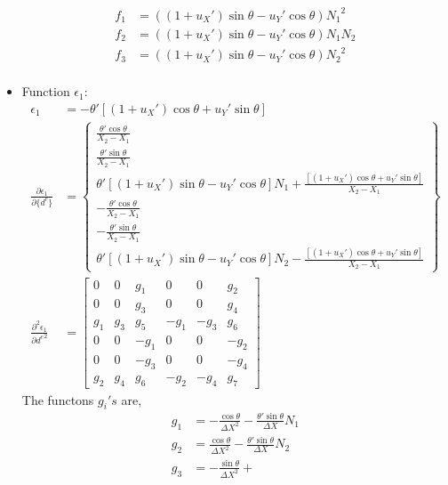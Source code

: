 \documentclass[10pt]{article}
\begin{document}
\begin{itemize}
\begin{align}
    f_1 &= ((1+u_X')\sin\theta - u_Y'\cos\theta){N_1}^2\nonumber\\
    f_2 &= ((1+u_X')\sin\theta - u_Y'\cos\theta)N_1N_2\nonumber\\
    f_3 &= ((1+u_X')\sin\theta - u_Y'\cos\theta){N_2}^2\nonumber\\
    \label{eq:g0e}    
  \end{align}
\item Function $\epsilon_1$:
  \begin{align}
    \epsilon_1 &= -\theta'\left[(1+u_X')\cos\theta +
                 u_Y'\sin\theta\right]\nonumber\\
    \frac{\partial \epsilon_1}{\partial \{d^e\}} &= \begin{Bmatrix}
      \frac{\theta'\cos\theta}{X_2-X_1}\\
      \frac{\theta'\sin\theta}{X_2-X_1}\\
      \theta' \left[(1+u_X')\sin\theta - u_Y'\cos\theta\right]N_1 +
      \frac{\left[(1+u_X')\cos\theta +
          u_Y'\sin\theta\right]}{X_2-X_1}\\
      -\frac{\theta'\cos\theta}{X_2-X_1}\\
      -\frac{\theta'\sin\theta}{X_2-X_1}\\
      \theta' \left[(1+u_X')\sin\theta - u_Y'\cos\theta\right]N_2 -
      \frac{\left[(1+u_X')\cos\theta +
          u_Y'\sin\theta\right]}{X_2-X_1}
    \end{Bmatrix}\nonumber\\
    \frac{\partial^2 \epsilon_1}{\partial {d^e}^2} &= \begin{bmatrix}
      0 & 0 & g_1 & 0 & 0 & g_2\\
      0 & 0 & g_3 & 0 & 0 & g_4\\
      g_1 & g_3 & g_5 & -g_1 & -g_3 & g_6\\
      0 & 0 & -g_1 & 0 & 0 & -g_2\\
      0 & 0 & -g_3 & 0 & 0 & -g_4\\
      g_2 & g_4 & g_6 & -g_2 & -g_4 & g_7
    \end{bmatrix}
    \label{eq:e1}
  \end{align}
  The functons $g_i's$ are,
  \begin{align}
    g_1 &= -\frac{\cos\theta}{\Delta X^2} -
          \frac{\theta'\sin\theta}{\Delta X}N_1\nonumber\\
    g_2 &= \frac{\cos\theta}{\Delta X^2} -
          \frac{\theta'\sin\theta}{\Delta X}N_2\nonumber\\
    g_3 &= -\frac{\sin\theta}{\Delta X^2} +

\end{align}
\end{itemize}
\end{document}
